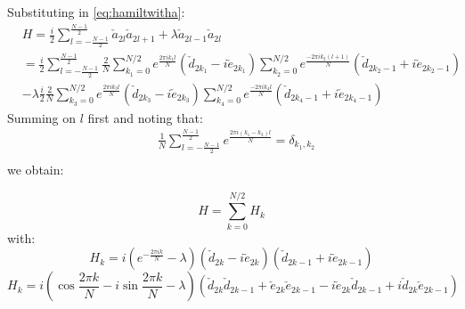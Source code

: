\documentclass[12pt,a4paper]{book}
\theoremstyle{definition}
\begin{document}
Substituting in \ref{eq:hamiltwitha}:
\begin{equation}\begin{aligned}
		&H =\frac{i}{2} \sum_{l=-\frac{N-1}{2}}^{\frac{N-1}{2}} \check{a}_{2 l} \check{a}_{2 l+1}  
		+ \lambda \check{a}_{2 l-1} \check{a}_{2 l} \\
		&=\frac{i}{2}\sum_{l=-\frac{N-1}{2}}^{\frac{N-1}{2}} \frac{2}{N}\sum_{k_1=0}^{N/2} e^{\frac{2 \pi i k_1 l}{N}}   \left(\check{d}_{2 k_1}-i\check{e}_{2 k_1}\right) \sum_{k_2=0}^{N/2} e^{\frac{-2 \pi i k_2 (l+1)}{N}}  \left(\check{d}_{2 k_2-1}+i\check{e}_{2 k_2-1}  \right)  \\
		&-\lambda\frac{i}{2} \frac{2}{N}\sum_{k_3=0}^{N/2} e^{\frac{2 \pi i k_3 l}{N}}   \left(\check{d}_{2 k_3}-i\check{e}_{2 k_3}\right) \sum_{k_4=0}^{N/2} e^{\frac{-2 \pi i k_4 l}{N}}  \left(\check{d}_{2 k_4-1}+i\check{e}_{2 k_4-1}  \right)\end{aligned}
\end{equation}	
Summing on $l$ first and noting that:
\begin{equation}\label{eq:delta}\begin{aligned}
		&\frac{1}{N}\sum_{l=-\frac{N-1}{2}}^{\frac{N-1}{2}}e^{\frac{2 \pi i (k_1-k_2) l}{N}} = \delta_{k_1,k_2}\\
	\end{aligned}
\end{equation}
we obtain:

\begin{equation}H=\sum_{k=0}^{N / 2} H_{k} \end{equation}
with:
\begin{equation}
	H_k =i   \left(e^{-\frac{2\pi i k}{N}} 
	- \lambda \right)  \left(\check{d}_{2 k}-i\check{e}_{2 k}\right) \left(\check{d}_{2 k-1}+i\check{e}_{2 k-1}  \right)
\end{equation}
\begin{equation}
	H_k =i  \left(\cos \frac{2 \pi k }{N}-i\sin \frac{2 \pi k }{N}
	- \lambda \right)  \left(\check{d}_{2 k}\check{d}_{2 k-1}+\check{e}_{2 k}\check{e}_{2 k-1}-i\check{e}_{2k}\check{d}_{2k-1}+i\check{d}_{2k}\check{e}_{2k-1}\right) 
\end{equation}
\end{document}

